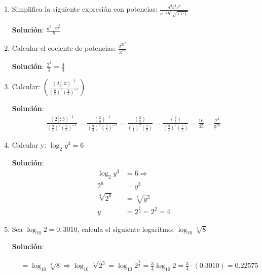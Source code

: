 \documentclass[11pt,letterpaper]{article}
\begin{document}
\begin{enumerate}

	\item Simplifica la siguiente expresión con potencias: $\frac{a^3b^4c^7}{a^{-2}b^5\sqrt{(c)}}$

	\textbf{Solución}: $\frac{a^5 \cdot c^{\frac{13}{2}}}{b}$

	\item Calcular el cociente de potencias: $\frac{2^33^2}{3^32}$

	\textbf{Solución}: $\frac{2^2}{3} = \frac{4}{3}$
	
	\item Calcular: $\left( \frac{\left( 2 \frac{3}{9} : 3\right)^{-1}}{\left(\frac{9}{4}\right)^2\left(\frac{2}{5}\right)^{-1}} \right)$

	\textbf{Solución}:
	\begin{align}
		\frac{\left( 2 \frac{3}{9} : 3\right)^{-1}}{\left(\frac{9}{4}\right)^2\left(\frac{2}{5}\right)^{-1}}
		= \frac{\left(  \frac{2}{9} \right)^{-1}}{\left(\frac{9}{4}\right)^2\left(\frac{2}{5}\right)^{-1}}
		= \frac{\left(  \frac{2}{5} \right)}{\left(\frac{9}{4}\right)^2\left(\frac{2}{9}\right)}
		= \frac{\left(  \frac{2}{5} \right)}{\left(\frac{9}{4}\right)^2\left(\frac{1}{2}\right)}
		= \frac{16}{45}
		= \frac{2^4}{3^25}
	\end{align}

	\item Calcular y: $\log_{2}y^3 = 6$

	\textbf{Solución}:
	\begin{align*}
		\log_{2}y^3 &= 6 \Rightarrow \\  
		2^6 &= y^3 \\
		\sqrt[3]{2^6} &= \sqrt[3]{y^3} \\
		y &= 2^{\frac{6}{3}} = 2^2 = 4
	\end{align*}
	
	\item Sea $\log_{10}2 = 0,3010$, calcula el siguiente logaritmo: $\log_{10}\sqrt[4]{8}$

	\textbf{Solución}:

	\begin{align*}
		&= \log_{10}\sqrt[4]{8} \Rightarrow \log_{10}\sqrt[4]{2^3} = \log_{10}2^{\frac{3}{4}} = \frac{3}{4}\log_{10}2 = \frac{3}{4} \cdot (0.3010) = 0.22575
	\end{align*}


\end{enumerate}
\end{document}
